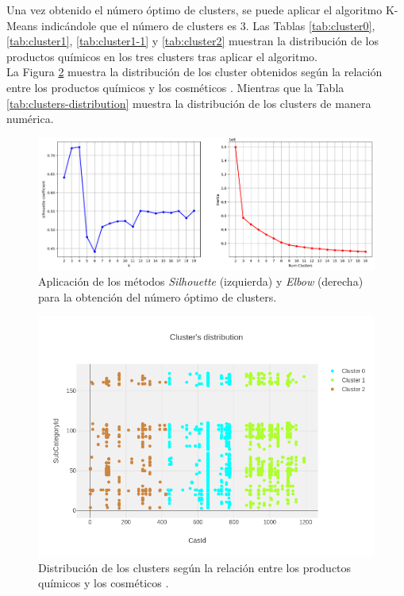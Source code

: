 Una vez obtenido el número óptimo de clusters, se puede aplicar el algoritmo K-Means indicándole que el número de clusters es 3. Las Tablas \ref{tab:cluster0}, \ref{tab:cluster1}, \ref{tab:cluster1-1} y \ref{tab:cluster2} muestran la distribución de los productos químicos en los tres clusters tras aplicar el algoritmo. \\

La Figura \ref{fig:clusters-distribution} muestra la distribución de los cluster obtenidos según la relación entre los productos químicos  y los cosméticos . Mientras que la Tabla \ref{tab:clusters-distribution} muestra la distribución de los clusters de manera numérica.

\newpage
\begin{figure}[!th]
\includegraphics[scale=0.45]{figures/silhouette-elbow-methods}
\centering
\caption{Aplicación de los métodos \textit{Silhouette} (izquierda) y \textit{Elbow} (derecha) para la obtención del número óptimo de clusters.}
\label{fig:silhouette-elbow-methods}
\end{figure}

\begin{figure}[!th]
\includegraphics[scale=0.5]{figures/clusters-distribution}
\centering
\caption{Distribución de los clusters según la relación entre los productos químicos  y los cosméticos .}
\label{fig:clusters-distribution}
\end{figure}

